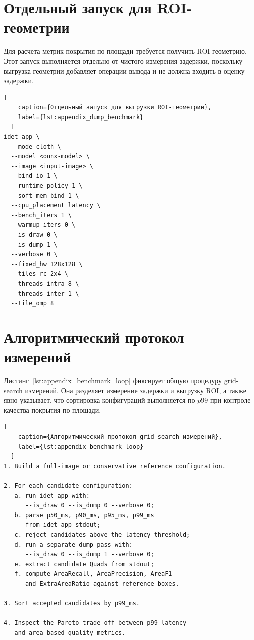 \documentclass[12pt,a4paper,oneside,openany]{report}
\begin{document}

\FloatBarrier
\section{Отдельный запуск для ROI-геометрии}

Для расчета метрик покрытия по площади требуется получить ROI-геометрию. Этот запуск выполняется
отдельно от чистого измерения задержки, поскольку выгрузка геометрии добавляет операции вывода и
не должна входить в оценку задержки.

\begin{lstlisting}[
    caption={Отдельный запуск для выгрузки ROI-геометрии},
    label={lst:appendix_dump_benchmark}
  ]
idet_app \
  --mode cloth \
  --model <onnx-model> \
  --image <input-image> \
  --bind_io 1 \
  --runtime_policy 1 \
  --soft_mem_bind 1 \
  --cpu_placement latency \
  --bench_iters 1 \
  --warmup_iters 0 \
  --is_draw 0 \
  --is_dump 1 \
  --verbose 0 \
  --fixed_hw 128x128 \
  --tiles_rc 2x4 \
  --threads_intra 8 \
  --threads_inter 1 \
  --tile_omp 8
\end{lstlisting}


\FloatBarrier
\section{Алгоритмический протокол измерений}

Листинг~\ref{lst:appendix_benchmark_loop} фиксирует общую процедуру grid-search измерений. Она
разделяет измерение задержки и выгрузку ROI, а также явно указывает, что сортировка конфигураций
выполняется по $p99$ при контроле качества покрытия по площади.

\begin{lstlisting}[
    caption={Алгоритмический протокол grid-search измерений},
    label={lst:appendix_benchmark_loop}
  ]
1. Build a full-image or conservative reference configuration.

2. For each candidate configuration:
   a. run idet_app with:
      --is_draw 0 --is_dump 0 --verbose 0;
   b. parse p50_ms, p90_ms, p95_ms, p99_ms
      from idet_app stdout;
   c. reject candidates above the latency threshold;
   d. run a separate dump pass with:
      --is_draw 0 --is_dump 1 --verbose 0;
   e. extract candidate Quads from stdout;
   f. compute AreaRecall, AreaPrecision, AreaF1
      and ExtraAreaRatio against reference boxes.

3. Sort accepted candidates by p99_ms.

4. Inspect the Pareto trade-off between p99 latency
   and area-based quality metrics.
\end{lstlisting}
\end{document}
